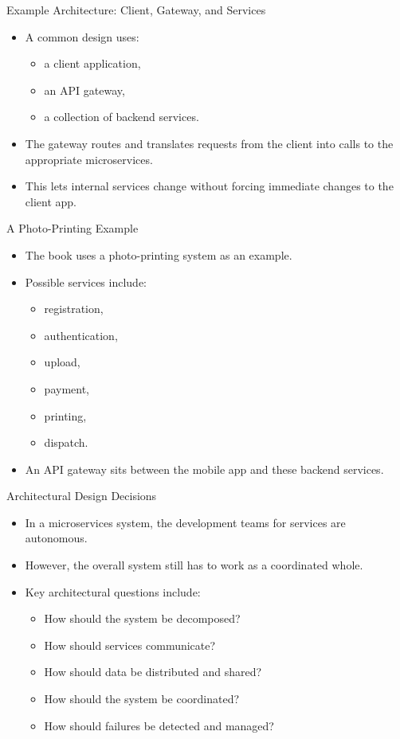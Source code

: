 \begin{frame}{Example Architecture: Client, Gateway, and Services}
\begin{itemize}
    \item A common design uses:
    \begin{itemize}
        \item a client application,
        \item an API gateway,
        \item a collection of backend services.
    \end{itemize}
    \item The gateway routes and translates requests from the client into calls to the appropriate microservices.
    \item This lets internal services change without forcing immediate changes to the client app.
\end{itemize}
\end{frame}

\begin{frame}{A Photo-Printing Example}
\begin{itemize}
    \item The book uses a photo-printing system as an example.
    \item Possible services include:
    \begin{itemize}
        \item registration,
        \item authentication,
        \item upload,
        \item payment,
        \item printing,
        \item dispatch.
    \end{itemize}
    \item An API gateway sits between the mobile app and these backend services.
\end{itemize}
\end{frame}

\begin{frame}{Architectural Design Decisions}
\begin{itemize}
    \item In a microservices system, the development teams for services are autonomous.
    \item However, the overall system still has to work as a coordinated whole.
    \item Key architectural questions include:
    \begin{itemize}
        \item How should the system be decomposed?
        \item How should services communicate?
        \item How should data be distributed and shared?
        \item How should the system be coordinated?
        \item How should failures be detected and managed?
    \end{itemize}
\end{itemize}
\end{frame}

